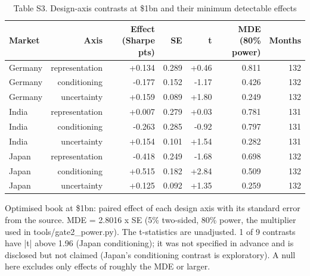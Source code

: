 \begin{table}[t]
\centering
\small
\caption{Table S3. Design-axis contrasts at \$1bn and their minimum detectable effects}
\label{tab:s3}
\begin{tabular}{lrrrrrr}
\toprule
Market & Axis & Effect (Sharpe pts) & SE & t & MDE (80\% power) & Months \\
\midrule
Germany & representation & +0.134 & 0.289 & +0.46 & 0.811 & 132 \\
Germany & conditioning & -0.177 & 0.152 & -1.17 & 0.426 & 132 \\
Germany & uncertainty & +0.159 & 0.089 & +1.80 & 0.249 & 132 \\
India & representation & +0.007 & 0.279 & +0.03 & 0.781 & 131 \\
India & conditioning & -0.263 & 0.285 & -0.92 & 0.797 & 131 \\
India & uncertainty & +0.154 & 0.101 & +1.54 & 0.282 & 131 \\
Japan & representation & -0.418 & 0.249 & -1.68 & 0.698 & 132 \\
Japan & conditioning & +0.515 & 0.182 & +2.84 & 0.509 & 132 \\
Japan & uncertainty & +0.125 & 0.092 & +1.35 & 0.259 & 132 \\
\bottomrule
\end{tabular}
\par\vspace{2pt}
\parbox{\textwidth}{\footnotesize Optimised book at \$1bn: paired effect of each design axis with its standard error from the source. MDE = 2.8016 x SE (5\% two-sided, 80\% power, the multiplier used in tools/gate2\_power.py). The t-statistics are unadjusted. 1 of 9 contrasts have |t| above 1.96 (Japan conditioning); it was not specified in advance and is disclosed but not claimed (Japan's conditioning contrast is exploratory). A null here excludes only effects of roughly the MDE or larger.}
\end{table}
